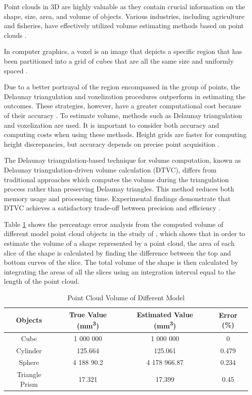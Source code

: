 Point clouds in 3D are highly valuable as they contain crucial information on the shape, size, area, and volume of objects. Various industries, including agriculture and fisheries, have effectively utilized volume estimating methods based on point clouds \citep{geuvara2020}.

In computer graphics, a voxel is an image that depicts a specific region that has been partitioned into a grid of cubes that are all the same size and uniformly spaced \citep{putman2018}.

Due to a better portrayal of the region encompassed in the group of points, the Delaunay triangulation and voxelization procedures outperform in estimating the outcomes. These strategies, however, have a greater computational cost because of their accuracy \citep{chee2015}. To estimate volume, methods such as Delaunay triangulation and voxelization are used. It is important to consider both accuracy and computing costs when using these methods. Height grids are faster for computing height discrepancies, but accuracy depends on precise point acquisition \citep{bewley2011, duff2000}.

The Delaunay triangulation-based technique for volume computation, known as Delaunay triangulation-driven volume calculation (DTVC), differs from traditional approaches which computes the volume during the triangulation process rather than preserving Delaunay triangles. This method reduces both memory usage and processing time. Experimental findings demonstrate that DTVC achieves a satisfactory trade-off between precision and efficiency \citep{liuY2021}.

Table \ref{tab:Point Cloud Volume of Different Objects} shows the percentage error analysis from the computed volume of different model point cloud objects in the study of \citet{chang2017}, which shows that in order to estimate the volume of a shape represented by a point cloud, the area of each slice of the shape is calculated by finding the difference between the top and bottom curves of the slice. The total volume of the shape is then calculated by integrating the areas of all the slices using an integration interval equal to the length of the point cloud. 

\begin{table}[H]
\caption{Point Cloud Volume of Different Model}
\label{tab:Point Cloud Volume of Different Objects}
\centering
\begin{tabular}{|c|c|c|c|}
    \hline
    Objects & True Value (\si{mm^3}) & Estimated Value (\si{mm^3}) & Error (\%) \\
    \hline
    Cube &  1 000 000 & 1 000 000 & 0 \\
    \hline
    Cylinder & 125.664 & 125.061 & 0.479 \\
    \hline
    Sphere & 4 188 90.2 & 4 178 966.87 & 0.234 \\
    \hline
    Triangle Prism & 17.321 & 17.399 & 0.45 \\
    \hline
\end{tabular}
\end{table}

